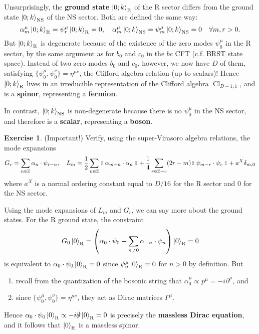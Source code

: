 \documentclass{report}
\theoremstyle{plain}
\theoremstyle{definition}
\newtheorem{exercise}{Exercise}[section]
\theoremstyle{remark}
\newcommand{\di}{\partial}
\newcommand{\circcolon}{\mathbin{\raise 0.75ex\hbox{\oalign{$\scriptscriptstyle\mathrm{o}$\cr$\scriptscriptstyle\mathrm{o}$}}}}
\newcommand{\CANO}[1]{\,\circcolon\mathrel{#1}\circcolon\,}
\newcommand{\bZ}{\mathbb{Z}}
\DeclareMathOperator{\Cl}{Cl}
\newcommand{\NS}{\mathrm{NS}}
\newcommand{\R}{\mathrm{R}}
\begin{document}
Unsurprisingly, the {\bf ground state} $\ket{0;k}_{\R}$ of the R sector
differs from the ground state $\ket{0;k}_{\NS}$ of the NS sector. Both
are defined the same way:
\[ \alpha^\mu_m \ket{0;k}_{\R} = \psi^\mu_r \ket{0;k}_{\R} = 0, \quad \alpha^\mu_m \ket{0;k}_{\NS} = \psi^\mu_m \ket{0;k}_{\NS} = 0 \quad \forall m, r > 0. \]
But $\ket{0;k}_{\R}$ is degenerate because of the existence of the zero
modes $\psi^\mu_0$ in the R sector, by the same argument as for $b_0$
and $c_0$ in the $bc$ CFT (c.f. BRST state space). Instead of two zero
modes $b_0$ and $c_0$, however, we now have $D$ of them, satisfying
$\{\psi^\mu_0, \psi^\nu_0\} = \eta^{\mu\nu}$, the Clifford algebra
relation (up to scalars)! Hence $\ket{0;k}_{\R}$ lives in an irreducible
representation of the Clifford algebra $\Cl_{D-1,1}$, and is a {\bf
  spinor}, representing a {\bf fermion}.

In contrast, $\ket{0;k}_{\NS}$ is non-degenerate because there is no
$\psi^\mu_0$ in the NS sector, and therefore is a {\bf scalar},
representing a {\bf boson}.

\begin{exercise} (Important!)
  Verify, using the super-Virasoro algebra relations, the mode
  expansions
  \[ G_r = \sum_{n \in \bZ} \alpha_n \cdot \psi_{r-n}, \quad L_m = \frac{1}{2} \sum_{n \in \bZ} \CANO{\alpha_{m-n} \cdot \alpha_n} + \frac{1}{4} \sum_{r \in \bZ + v} (2r - m) \CANO{\psi_{m-r} \cdot \psi_r} + a^X \delta_{m,0} \]
  where $a^X$ is a normal ordering constant equal to $D/16$ for the R
  sector and $0$ for the NS sector.
\end{exercise}

Using the mode expansions of $L_m$ and $G_r$, we can say more about
the ground states. For the R ground state, the constraint
\[ G_0 \ket{0}_{\R} = \left(\alpha_0 \cdot \psi_0 + \sum_{n \neq 0} \alpha_{-n} \cdot \psi_n\right)\ket{0}_{\R} = 0 \]
is equivalent to $\alpha_0 \cdot \psi_0 \ket{0}_{\R} = 0$ since
$\psi_n^\mu\ket{0}_{\R} = 0$ for $n > 0$ by definition. But
\begin{enumerate}
\item recall from the quantization of the bosonic string that
  $\alpha_0^\mu \propto p^\mu = -i \di^\mu$, and
\item since $\{\psi^\mu_0, \psi^\nu_0\} = \eta^{\mu\nu}$, they act as
  Dirac matrices $\Gamma^\mu$.
\end{enumerate}
Hence $\alpha_0 \cdot \psi_0 \ket{0}_{\R} \propto -i \slashed{\di}
\ket{0}_{\R} = 0$ is precisely the {\bf massless Dirac equation}, and
it follows that $\ket{0}_{\R}$ is a massless spinor.
\end{document}
